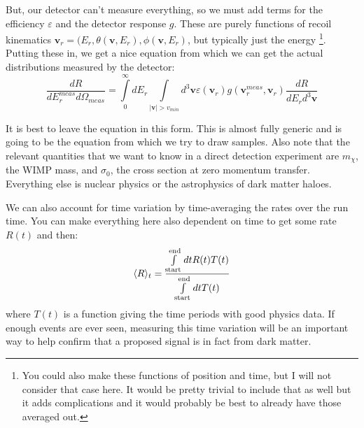 \documentclass{article}
\begin{document}
But, our detector can't measure everything, so we must add terms for the efficiency $\varepsilon$ and the detector response $g$. These are purely functions of recoil kinematics $\mathbf{v}_r = (E_r, \theta(\mathbf{v},E_r),\phi(\mathbf{v},E_r)$, but typically just the energy \footnote{You could also make these functions of position and time, but I will not consider that case here. It would be pretty trivial to include that as well but it adds complications and it would probably be best to already have those averaged out.}. Putting these in, we get a nice equation from which we can get the actual distributions measured by the detector:
\begin{equation}
\frac{dR}{dE_r^{meas} d\Omega_{meas}} =\int\limits_0^\infty dE_r \int\limits_{|\mathbf{v}|>v_{min}} d^3\mathbf{v}  \varepsilon(\mathbf{v}_r)g(\mathbf{v}_r^{meas},\mathbf{v}_r)\frac{dR}{dE_r d^3\mathbf{v}}
\end{equation}

It is best to leave the equation in this form. This is almost fully generic and is going to be the equation from which we try to draw samples. Also note that the relevant quantities that we want to know in a direct detection experiment are $m_\chi$, the WIMP mass, and $\sigma_0$, the cross section at zero momentum transfer. Everything else is nuclear physics or the astrophysics of dark matter haloes.

We can also account for time variation by time-averaging the rates over the run time. You can make everything here also dependent on time to get some rate $R(t)$ and then:
\begin{equation}
\langle R \rangle_t = \frac{\int\limits_{\rm start}^{\rm end} dt R(t) T(t) }{\int\limits_{\rm start}^{\rm end} dt T(t)}
\end{equation}
where $T(t)$ is a function giving the time periods with good physics data. If enough events are ever seen, measuring this time variation will be an important way to help confirm that a proposed signal is in fact from dark matter.
\end{document}
